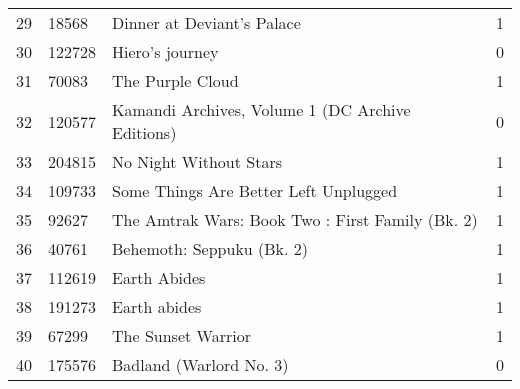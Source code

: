 \begin{tabular}{llll}
29 & 18568 & Dinner at Deviant's Palace & 1 \\
30 & 122728 & Hiero's journey & 0 \\
31 & 70083 & The Purple Cloud & 1 \\
32 & 120577 & Kamandi Archives, Volume 1 (DC Archive Editions) & 0 \\
33 & 204815 & No Night Without Stars & 1 \\
34 & 109733 & Some Things Are Better Left Unplugged & 1 \\
35 & 92627 & The Amtrak Wars: Book Two : First Family (Bk. 2) & 1 \\
36 & 40761 & Behemoth: Seppuku (Bk. 2) & 1 \\
37 & 112619 & Earth Abides & 1 \\
38 & 191273 & Earth abides & 1 \\
39 & 67299 & The Sunset Warrior & 1 \\
40 & 175576 & Badland (Warlord No. 3) & 0 \\
\bottomrule
\end{tabular}
